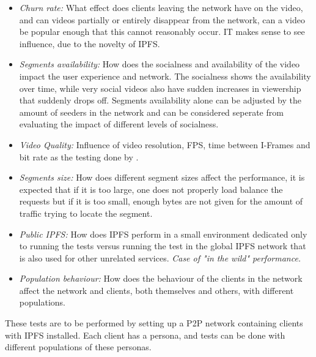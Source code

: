 \begin{itemize}
    \item \textit{Churn rate:}
    What effect does clients leaving the network have on the video, and can videos partially or entirely disappear from the network, can a video be popular enough that this cannot reasonably occur. IT makes sense to see influence, due to the novelty of IPFS.
    \item \textit{Segments availability:}
    How does the socialness and availability of the video impact the user experience and network. The socialness shows the availability over time, while very social videos also have sudden increases in viewership that suddenly drops off. Segments availability alone can be adjusted by the amount of seeders in the network and can be considered seperate from evaluating the impact of different levels of socialness.
    \item \textit{Video Quality:}
    Influence of video resolution, \ac{FPS}, time between I-Frames and bit rate as the testing done by \citeauthor{aloman2015performance}.
    \item \textit{Segments size:}
    How does different segment sizes affect the performance, it is expected that if it is too large, one does not properly load balance the requests but if it is too small, enough bytes are not given for the amount of traffic trying to locate the segment.
    \item \textit{Public IPFS:}
    How does \ac{IPFS} perform in a small environment dedicated only to running the tests versus running the test in the global \ac{IPFS} network that is also used for other unrelated services.
    \textit{Case of "in the wild" performance.} 
    \item \textit{Population behaviour:}
    How does the behaviour of the clients in the network affect the network and clients, both themselves and others, with different populations.
\end{itemize}
These tests are to be performed by setting up a \ac{P2P} network containing clients with \ac{IPFS} installed. Each client has a persona, and tests can be done with different populations of these personas.

